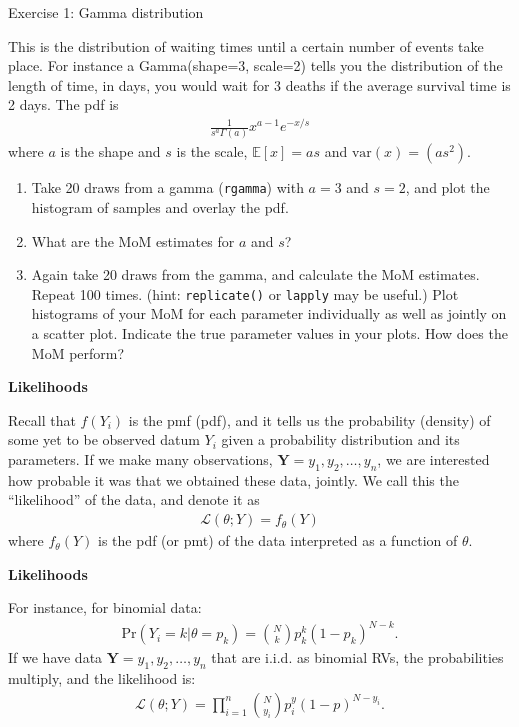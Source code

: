 \documentclass[12pt,xcolor=svgnames]{beamer}
\newcommand{\bl}{\color{blue}}
\newcommand{\theme}{\color{FireBrick}}
\newcommand{\mc}[1]{\mathcal{#1}}
\newcommand{\mb}[1]{\mathbf{#1}}
\newcommand{\ds}[1]{\mathds{#1}}
\newcommand{\sk}{\vspace{.4cm}}
\newcommand{\nochap}{\vspace{0.5cm}}
\newcommand{\chap}[1]{{\theme \Large \bf #1} \sk}
\newcommand{\E}{\ds{E}}
\newcommand{\pr}{\text{Pr}}
\newcommand{\var}{\text{var}}
\newcommand{\mL}{\mc{L}}
\begin{document}
\begin{frame}
\nochap
{\bl Exercise 1: Gamma distribution}\\
{\scriptsize
This is the distribution of waiting times until a certain number of events take place. For instance a Gamma(shape=3, scale=2) tells you the distribution of the length of time, in days, you would wait for 3 deaths if the average survival time is 2 days. The pdf is 
\begin{align*}
\frac{1}{s^a\Gamma(a)}x^{a-1}e^{-x/s}
\end{align*}
where $a$ is the shape and $s$ is the scale, $\E[x]=as$ and $\var(x)=(as^2)$. 
\begin{enumerate}
\item Take 20 draws from a gamma ({\bl \tt rgamma}) with $a=3$ and $s=2$, and plot the histogram of samples and overlay the pdf.
\item What are the MoM estimates for $a$ and $s$?
\item Again take 20 draws from the gamma, and calculate the MoM estimates. Repeat 100 times. (hint: {\tt replicate()} or {\tt lapply} may be useful.) Plot histograms of your MoM for each parameter individually as well as jointly on a scatter plot. Indicate the true parameter values in your plots. How does the MoM perform?
\end{enumerate}
}

\end{frame}



\begin{frame}
\chap{Likelihoods}

Recall that $f(Y_i)$ is the pmf (pdf), and it tells us the probability (density) of some yet to be observed datum $Y_i$ given a probability distribution and its parameters. If we make many observations, $\mb{Y}=y_1, y_2, \dots, y_n$, we are interested how probable it was that we obtained these data, jointly. We call this the ``likelihood'' of the data, and denote it as 
\begin{align*}
\mL(\theta; Y)=f_\theta(Y)
\end{align*}
where $f_\theta(Y)$ is the pdf (or pmt) of the data interpreted as a function of $\theta$. 

\end{frame}


\begin{frame}
\chap{Likelihoods}

For instance, for binomial data:
\begin{align*}
\pr(Y_i=k | \theta=p_k)=  {N \choose k} p_k^k(1-p_k)^{N-k}.
\end{align*}
If we have data  $\mb{Y}=y_1, y_2, \dots, y_n$ that are i.i.d. as binomial RVs, the probabilities multiply, and the likelihood is:
\begin{align*}
\mL(\theta; Y) = \prod_{i=1}^n {N \choose y_i} p^y_i(1-p)^{N-y_i}.
\end{align*}


\end{frame}
\end{document}
